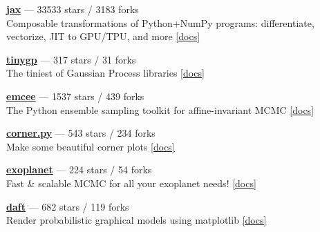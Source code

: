 \item \href{https://github.com/jax-ml/jax}{{\bf jax}} --- 33533 stars / 3183 forks \\
Composable transformations of Python+NumPy programs: differentiate, vectorize, JIT to GPU/TPU, and more \href{https://docs.jax.dev}{[docs]}

\item \href{https://github.com/dfm/tinygp}{{\bf tinygp}} --- 317 stars / 31 forks \\
The tiniest of Gaussian Process libraries \href{https://tinygp.readthedocs.io}{[docs]}

\item \href{https://github.com/dfm/emcee}{{\bf emcee}} --- 1537 stars / 439 forks \\
The Python ensemble sampling toolkit for affine-invariant MCMC \href{https://emcee.readthedocs.io}{[docs]}

\item \href{https://github.com/dfm/corner.py}{{\bf corner.py}} --- 543 stars / 234 forks \\
Make some beautiful corner plots \href{http://corner.readthedocs.io}{[docs]}

\item \href{https://github.com/exoplanet-dev/exoplanet}{{\bf exoplanet}} --- 224 stars / 54 forks \\
Fast {\&} scalable MCMC for all your exoplanet needs!  \href{https://docs.exoplanet.codes}{[docs]}

\item \href{https://github.com/daft-dev/daft}{{\bf daft}} --- 682 stars / 119 forks \\
Render probabilistic graphical models using matplotlib \href{https://docs.daft-pgm.org}{[docs]}